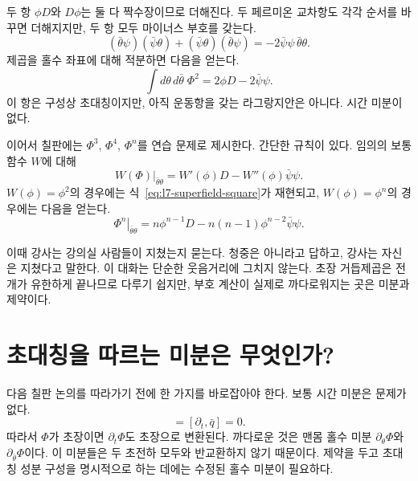 두 항 \(\phi D\)와 \(D\phi\)는 둘 다 짝수장이므로 더해진다. 두 페르미온 교차항도 각각 순서를 바꾸면 더해지지만, 두 항 모두 마이너스 부호를 갖는다.
\begin{equation}
(\bar\theta\psi)(\bar\psi\theta)
+(\bar\psi\theta)(\bar\theta\psi)
=-2\bar\psi\psi\,\bar\theta\theta.
\end{equation}
제곱을 홀수 좌표에 대해 적분하면 다음을 얻는다.
\begin{equation}
\int d\theta\,d\bar\theta\;\Phi^2
=2\phi D-2\bar\psi\psi.
\end{equation}
이 항은 구성상 초대칭이지만, 아직 운동항을 갖는 라그랑지안은 아니다. 시간 미분이 없다.

이어서 칠판에는 \(\Phi^3\), \(\Phi^4\), \(\Phi^n\)를 연습 문제로 제시한다. 간단한 규칙이 있다. 임의의 보통 함수 \(W\)에 대해
\begin{equation}
\left.W(\Phi)\right|_{\bar\theta\theta}
=W'(\phi)D-W''(\phi)\bar\psi\psi.
\label{eq:l7-function-top-component}
\end{equation}
\(W(\phi)=\phi^2\)의 경우에는 식~\eqref{eq:l7-superfield-square}가 재현되고, \(W(\phi)=\phi^n\)의 경우에는 다음을 얻는다.
\begin{equation}
\left.\Phi^n\right|_{\bar\theta\theta}
=n\phi^{n-1}D-n(n-1)\phi^{n-2}\bar\psi\psi.
\end{equation}

이때 강사는 강의실 사람들이 지쳤는지 묻는다. 청중은 아니라고 답하고, 강사는 자신은 지쳤다고 말한다. 이 대화는 단순한 웃음거리에 그치지 않는다. 초장 거듭제곱은 전개가 유한하게 끝나므로 다루기 쉽지만, 부호 계산이 실제로 까다로워지는 곳은 미분과 제약이다.

\section{초대칭을 따르는 미분은 무엇인가?}

다음 칠판 논의를 따라가기 전에 한 가지를 바로잡아야 한다. 보통 시간 미분은 문제가 없다.
\begin{equation}
[\partial_t,q]=[\partial_t,\bar q]=0.
\end{equation}
따라서 \(\Phi\)가 초장이면 \(\partial_t\Phi\)도 초장으로 변환된다. 까다로운 것은 맨몸 홀수 미분 \(\partial_\theta\Phi\)와 \(\partial_{\bar\theta}\Phi\)이다. 이 미분들은 두 초전하 모두와 반교환하지 않기 때문이다. 제약을 두고 초대칭 성분 구성을 명시적으로 하는 데에는 수정된 홀수 미분이 필요하다.

